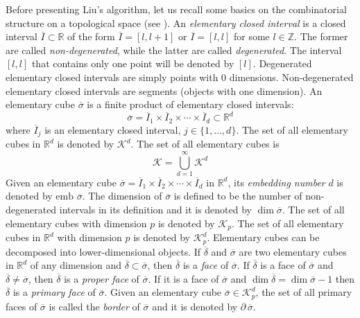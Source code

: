 \documentclass[journal]{IEEEtran}
\begin{document}
Before presenting Liu's algorithm, let us recall some basics on the
combinatorial structure on a topological space (see \cite{kaczynski2004computational}).
An \emph{elementary closed interval} is a closed interval $\overline{I} \subset
\mathbb{R}$ of the form $\overline{I} = [l, l+1] \mbox{ or } \overline{I} = [l,
l]$ for some $l \in \mathbb{Z}$. The former are called \emph{non-degenerated},
while the latter are called \emph{degenerated}. The interval $[l,l]$ that
contains only one point will be denoted by $[l]$. Degenerated elementary closed
intervals are simply points with 0 dimensions. Non-degenerated elementary closed
intervals are segments (objects with one dimension). An elementary cube
$\overline{\sigma}$ is a finite product of elementary closed intervals:
$$
\overline{\sigma} = \overline{I}_1 \times \overline{I}_2 \times \cdots \times
\overline{I}_d \subset \mathbb{R}^d
$$
where $\overline{I}_j$ is an elementary closed interval, $j\in\{1,\dots,d\}$. The set
of all elementary cubes in $\mathbb{R}^d$ is denoted by $\mathcal{K}^d$. The set
of all elementary cubes is
$$
\mathcal{K} = \bigcup_{d=1}^\infty \mathcal{K}^d
$$
Given an elementary cube $\overline{\sigma} = \overline{I}_1 \times
\overline{I}_2 \times \cdots \times \overline{I}_d$ in
$\mathbb{R}^d$, its \emph{embedding number} $d$ is denoted by
$\mbox{emb }\overline{\sigma}$. The dimension of $\overline{\sigma}$
is defined to be the number of non-degenerated intervals in its
definition and it is denoted by $\dim \overline{\sigma}$. The set of
all elementary cubes with dimension $p$ is denoted by
$\mathcal{K}_p$. The set of all elementary cubes in $\mathbb{R}^d$
with dimension $p$ is denoted by $\mathcal{K}^d_p$. Elementary cubes
can be decomposed into lower-dimensional objects. If
$\overline{\delta}$ and $\overline{\sigma}$ are two elementary cubes
in $\mathbb{R}^d$ of any dimension and $\overline{\delta} \subset \overline{\sigma}$,
then $\overline{\delta}$ is a \emph{face} of $\overline{\sigma}$. If
$\overline{\delta}$ is a face of $\overline{\sigma}$ and
$\overline{\delta} \neq \overline{\sigma}$, then $\overline{\delta}$
is a \emph{proper face} of $\overline{\sigma}$. If it is a face of
$\overline{\sigma}$ and $\dim \overline{\delta} = \dim
\overline{\sigma} - 1$ then $\overline{\delta}$ is a \emph{primary
face} of $\overline{\sigma}$. Given an elementary cube
$\overline{\sigma} \in \mathcal{K}^d_p$, the set of all primary
faces of $\overline{\sigma}$ is called the \emph{border} of
$\overline{\sigma}$ and it is denoted by $\partial\,
\overline{\sigma}$.
\end{document}
